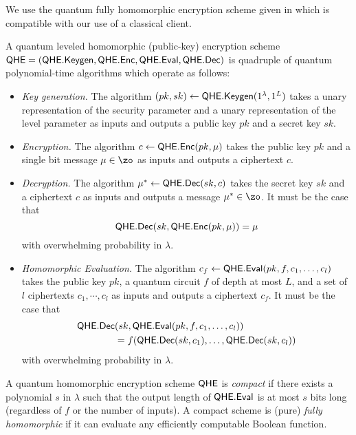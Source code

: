 We use the quantum fully homomorphic encryption scheme given in \cite{mahadev_qfhe} which is compatible with our use of a classical client.
\begin{definition}
    A quantum leveled homomorphic (public-key) encryption scheme $\mathsf{QHE}=(\mathsf{QHE.Keygen}, \mathsf{QHE.Enc}, \mathsf{QHE.Eval}, \mathsf{QHE.Dec})$ is quadruple of quantum polynomial-time algorithms which operate as follows:
    \begin{itemize}
        \item \emph{Key generation.}
            The algorithm $(pk, sk)\leftarrow\mathsf{QHE.Keygen}(1^\lambda, 1^L)$ takes a unary representation of the security parameter and a unary representation of the level parameter as inputs and outputs a public key $pk$ and a secret key $sk$.
        \item \emph{Encryption.}
            The algorithm $c\leftarrow\mathsf{QHE.Enc}(pk, \mu)$ takes the public key $pk$ and a single bit message $\mu\in\zo$ as inputs and outputs a ciphertext $c$.
        \item \emph{Decryption.}
            The algorithm $\mu^*\leftarrow\mathsf{QHE.Dec}(sk, c)$ takes the secret key $sk$ and a ciphertext $c$ as inputs and outputs a message $\mu^*\in\zo$.
            It must be the case that
                $$\mathsf{QHE.Dec}(sk, \mathsf{QHE.Enc}(pk, \mu))=\mu$$
            with overwhelming probability in $\lambda$.
        \item \emph{Homomorphic Evaluation.}
            The algorithm $c_f\leftarrow\mathsf{QHE.Eval}(pk, f, c_1, \ldots, c_l)$ takes the public key $pk$, a quantum circuit $f$ of depth at most $L$, and a set of $l$ ciphertexts $c_1,\cdots,c_l$ as inputs and outputs a ciphertext $c_f$.
            It must be the case that
            \begin{align*}
                \mathsf{QHE.Dec}&(sk, \mathsf{QHE.Eval}(pk, f, c_1, \ldots, c_l))
                \\
                &=f(\mathsf{QHE.Dec}(sk, c_1),\ldots,\mathsf{QHE.Dec}(sk, c_l))
            \end{align*}
            with overwhelming probability in $\lambda$.
    \end{itemize}
\end{definition}

\begin{definition}
    A quantum homomorphic encryption scheme $\mathsf{QHE}$ is \emph{compact} if
    there exists a polynomial $s$ in $\lambda$ such that the output length of $\mathsf{QHE.Eval}$ is at most $s$ bits long (regardless of $f$ or
    the number of inputs). A compact scheme is (pure) \emph{fully homomorphic} if it can evaluate any efficiently computable
    Boolean function.
\end{definition}

